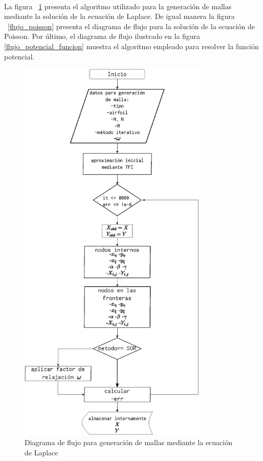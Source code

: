 \documentclass[letterpaper, openright, 12pt]{book}
\begin{document}
    \paragraph*{}
        La figura ~\ref{flujo_laplace} presenta el algoritmo utilizado para la
        generación de mallas mediante la solución de la ecuación de Laplace.
        De igual manera la figura ~\ref{flujo_poisson} presenta el diagrama
        de flujo para la solución de la ecuación de Poisson. Por último, el
        diagrama de flujo ilustrado en la figura \ref{flujo_potencial_funcion}
        muestra el algoritmo empleado para resolver la función potencial.

    \begin{figure}[htbp!]
        \centering
        \includegraphics[keepaspectratio, width=90mm]{./Imagenes/flujo_laplace}
        \caption{Diagrama de flujo para generación de mallas mediante la
            ecuación de Laplace}
        \label{flujo_laplace}
    \end{figure}
\end{document}
